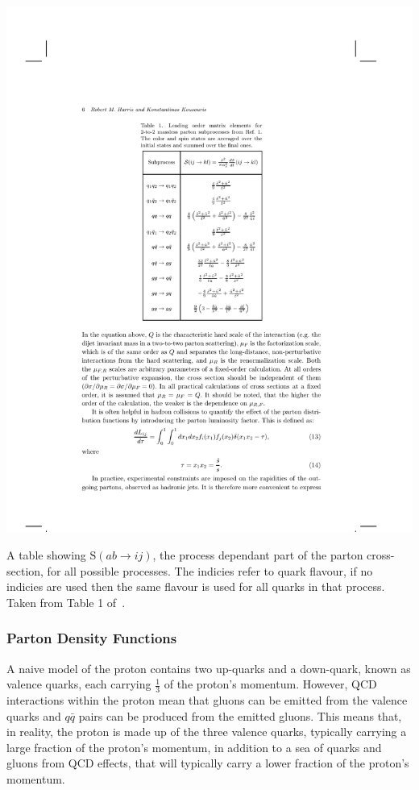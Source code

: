 \begin{table}[!hbt]
  \begin{center}
    \includegraphics[width=0.7\linewidth, angle=0]{figs/Theory/qcd_dijet_stable.pdf}
  \end{center}
  \caption[A table showing $\text{S}(ab \to ij)$, the process dependant part of the parton cross-section, for all possible processes.
    The indicies refer to quark flavour, if no indicies are used then the same flavour is used for all quarks in that process.]
          {A table showing $\text{S}(ab \to ij)$, the process dependant part of the parton cross-section, for all possible processes.
            The indicies refer to quark flavour, if no indicies are used then the same flavour is used for all quarks in that process. Taken from Table 1 of~\cite{theo-dijet_harris}.}
  \label{tab:theo-qcd_dijet_s}
\end{table}

\newpage
\subsubsection{Parton Density Functions}
\label{sec:theo-qcd_pdf}

A naive model of the proton contains two up-quarks and a down-quark,
known as valence quarks, each carrying $\frac{1}{3}$ of the proton's momentum.
However, QCD interactions within the proton mean that gluons can be emitted from the valence quarks
and $q\bar{q}$ pairs can be produced from the emitted gluons.
This means that, in reality, the proton is made up of the three valence quarks, typically carrying a large fraction of the proton's momentum,
in addition to a sea of quarks and gluons from QCD effects, that will typically carry a lower fraction of the proton's momentum.

